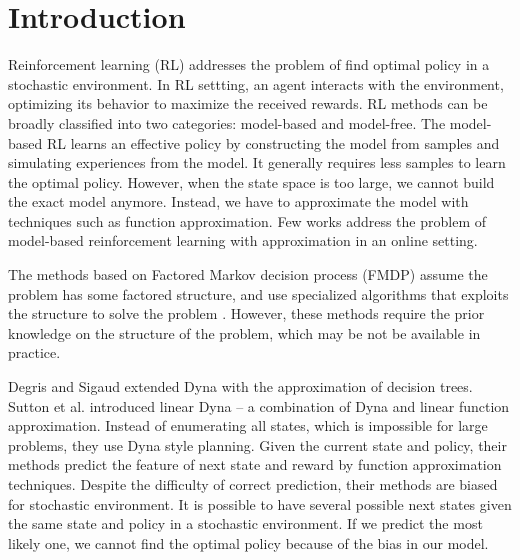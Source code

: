 \documentclass{article} %
\begin{document}

\section{Introduction}

Reinforcement learning (RL) addresses the problem of find optimal policy in a stochastic environment.
In RL settting, an agent interacts with the environment, optimizing its behavior to
maximize the received rewards.
RL methods can be broadly classified into two categories: model-based and
model-free.  The model-based RL learns an effective policy by
constructing the model from samples and simulating experiences from the model. It
generally requires less samples to learn the optimal policy.  However, when the
state space is too large, we cannot build the exact model anymore.  Instead, we
have to approximate the model with techniques such as function approximation. Few works
address the problem of model-based reinforcement learning with approximation in
an online setting.

The methods based on Factored Markov decision process (FMDP) assume the problem has some factored structure, and use 
specialized algorithms that exploits the structure to solve the problem\cite{ApproxFactor} \cite{SPUDD}. 
However, these methods require the prior knowledge
on the structure of the problem, which may be not be available in practice.

Degris and Sigaud \cite{ApproxTree} extended Dyna \cite{Dyna} with the approximation of decision trees.
Sutton et al. \cite{ApproxDyna} introduced linear Dyna -- a combination 
of Dyna and linear function approximation. 
Instead of enumerating all states, which is impossible for large problems, they
use Dyna style planning. Given the current state and policy, 
their methods predict the feature of next state and reward by function approximation
techniques. Despite the difficulty of correct prediction, their methods are biased 
for stochastic environment. It is possible to have
several possible next states given the same state and policy in a stochastic environment.
If we predict the most likely one, we cannot find the optimal policy because of the bias in our model.
\end{document}
